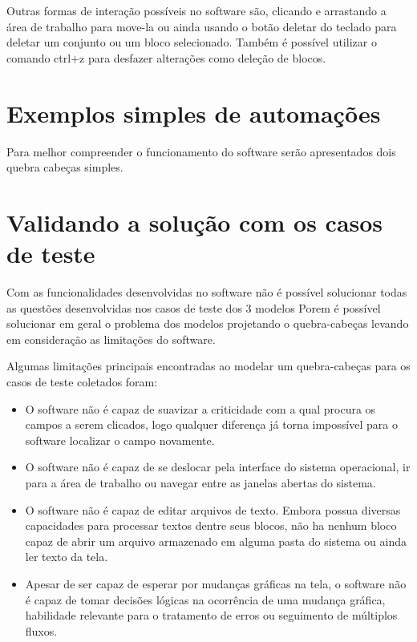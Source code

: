 \documentclass[tg]{mdtufsm}
\begin{document}
                Outras formas de interação possíveis no software são, clicando e arrastando a área de trabalho para move-la ou ainda usando o botão deletar do teclado para deletar um conjunto ou um bloco selecionado. Também é possível utilizar o comando ctrl+z para desfazer alterações como deleção de blocos.

            \section {Exemplos simples de automações}

                Para melhor compreender o funcionamento do software serão apresentados dois quebra cabeças simples.

            \section {Validando a solução com os casos de teste}

            Com as funcionalidades desenvolvidas no software não é possível solucionar todas as questões desenvolvidas nos casos de teste dos 3 modelos Porem é possível solucionar em geral o problema dos modelos projetando o quebra-cabeças levando em consideração as limitações do software.

            Algumas limitações principais encontradas ao modelar um quebra-cabeças para os casos de teste coletados foram:

            \begin{itemize}
                \item O software não é capaz de suavizar a criticidade com a qual procura os campos a serem clicados, logo qualquer diferença já torna impossível para o software localizar o campo novamente.
                \item O software não é capaz de se deslocar pela interface do sistema operacional, ir para a área de trabalho ou navegar entre as janelas abertas do sistema.
                \item O software não é capaz de editar arquivos de texto. Embora possua diversas capacidades para processar textos dentre seus blocos, não ha nenhum bloco capaz de abrir um arquivo armazenado em alguma pasta do sistema ou ainda ler texto da tela.
                \item Apesar de ser capaz de esperar por mudanças gráficas na tela, o software não é capaz de tomar decisões lógicas na ocorrência de uma mudança gráfica, habilidade relevante para o tratamento de erros ou seguimento de múltiplos fluxos.
            \end{itemize}
\end{document}
